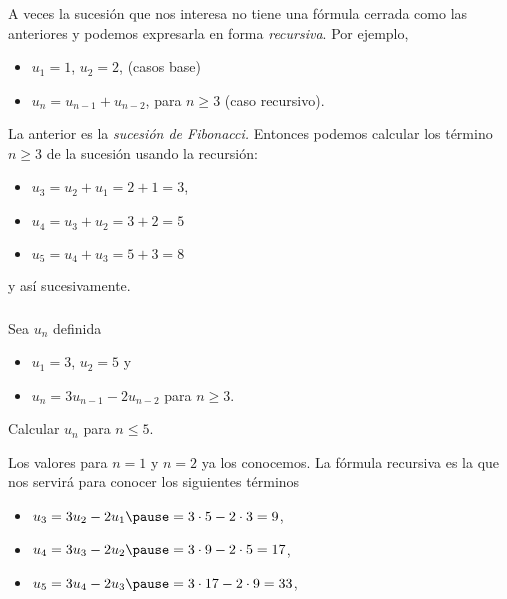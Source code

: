 \documentclass[handout]{beamer} %
\begin{document}
\begin{frame}\frametitle{ }  

A veces la sucesión que nos interesa no tiene una fórmula cerrada como las anteriores y podemos expresarla en forma \textit{recursiva}.  \pause Por ejemplo,

\medspace

\begin{itemize}
	\item $u_1=1$, $u_2=2$, (casos base)   \pause
	\item $u_n =u_{n-1} +u_{n-2}$, para $n\ge 3$ (caso recursivo).   \pause
\end{itemize} 

\medspace

La anterior es la \textit{sucesión de Fibonacci.} Entonces podemos calcular los término $n \ge 3$  de la sucesión usando la recursión:

\medspace  \pause

\begin{itemize}
	\item $u_3 =  u_2 + u_1 =  2 +1=3$,  \pause
	\item $u_4 =  u_3 + u_2 = 3 +2 =5$  \pause
	\item $u_5 =  u_4 + u_3 = 5 +3 =8$
\end{itemize} 
y así sucesivamente.
\end{frame}


\begin{frame}\frametitle{} 
	 \begin{ejemplo} Sea $u_n$ definida
	 	\begin{itemize}
	 		\item $ u_1=3$, $u_2=5$ y
	 		\item $u_n=3 u_{n-1} - 2 u_{n-2}$ para $n\geq 3$.
	 	\end{itemize}
 	Calcular $u_n$ para $n \le 5$.\pause 
	 \end{ejemplo}
	\begin{solucion} \pause Los valores para $n=1$ y $n=2$ ya los conocemos. La fórmula recursiva es la que nos servirá para conocer los siguientes términos
	\begin{itemize}
	\pause \item $u_{3} = 3 u_{2} - 2 u_{1}\pause = 3 \cdot 5 - 2 \cdot 3 = 9$,
	\pause \item $u_{4} = 3 u_{3} - 2 u_{2}\pause = 3 \cdot 9 - 2 \cdot 5 = 17$,
	\pause \item $u_{5} = 3 u_{4} - 2 u_{3}\pause = 3 \cdot 17 - 2 \cdot 9  = 33$,

	\end{itemize}
	\end{solucion}
	
	 
	
\end{frame}
\end{document}
